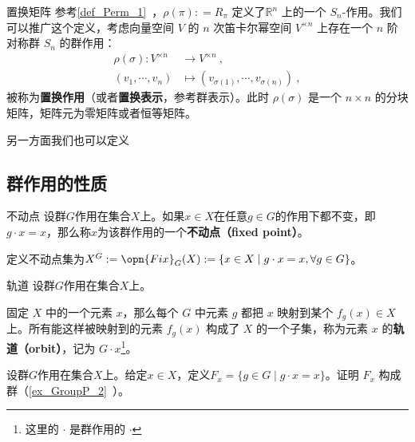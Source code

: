 \begin{example}{置换矩阵}
参考\autoref{def_Perm_1}~，$\rho(\pi): = R_\pi$ 定义了$\mathbb{R}^n$ 上的一个 $S_n$-作用。我们可以推广这个定义，考虑向量空间 $V$ 的 $n$ 次笛卡尔幂空间 $V^{\times n}$ 上存在一个 $n$ 阶对称群 $S_n$ 的群作用：
\begin{equation}
\begin{aligned}
\rho(\sigma): V^{\times n} &\to V^{\times n}~, \\
(v_1, \cdots, v_n) &\mapsto (v_{\sigma(1)}, \cdots, v_{\sigma(n)})~,
\end{aligned}
\end{equation}
被称为\textbf{置换作用}（或者\textbf{置换表示}，参考群表示）。此时 $\rho(\sigma)$ 是一个 $n \times n$ 的分块矩阵，矩阵元为零矩阵或者恒等矩阵。

另一方面我们也可以定义
\end{example}


\subsection{群作用的性质}


\begin{definition}{不动点}\label{def_Group3_2}
设群$G$作用在集合$X$上。如果$x\in X$在任意$g\in G$的作用下都不变，即$g\cdot x=x$，那么称$x$为该群作用的一个\textbf{不动点（fixed point）}。

定义不动点集为$X^G: = \opn{Fix}_G(X): = \{x\in X\mid g\cdot x=x, \forall g\in G\}$。
\end{definition}




\begin{definition}{轨道}
设群$G$作用在集合$X$上。

固定 $X$ 中的一个元素 $x$，那么每个 $G$ 中元素 $g$ 都把 $x$ 映射到某个 $f_g(x)\in X$ 上。所有能这样被映射到的元素 $f_g(x)$ 构成了 $X$ 的一个子集，称为元素 $x$ 的\textbf{轨道（orbit）}，记为 $G \cdot x$\footnote{这里的 $\cdot$ 是群作用的 $\cdot$ }。
\end{definition}









\begin{exercise}{}\label{exe_Group3_1}
设群$G$作用在集合$X$上。给定$x\in X$，定义$F_x=\{g\in G\mid g\cdot x=x\}$。证明 $F_x$ 构成群（\autoref{ex_GroupP_2}~）。
\end{exercise}




